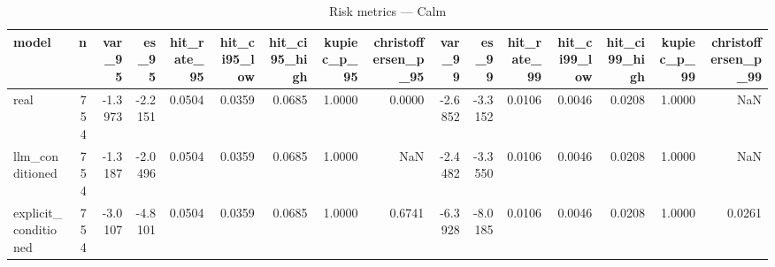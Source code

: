 \begin{table}
\caption{Risk metrics — Calm}
\label{tab:risk_Calm}
\begin{tabular}{lrrrrrrrrrrrrrrr}
\toprule
model & n & var\_95 & es\_95 & hit\_rate\_95 & hit\_ci95\_low & hit\_ci95\_high & kupiec\_p\_95 & christoffersen\_p\_95 & var\_99 & es\_99 & hit\_rate\_99 & hit\_ci99\_low & hit\_ci99\_high & kupiec\_p\_99 & christoffersen\_p\_99 \\
\midrule
real & 754 & -1.3973 & -2.2151 & 0.0504 & 0.0359 & 0.0685 & 1.0000 & 0.0000 & -2.6852 & -3.3152 & 0.0106 & 0.0046 & 0.0208 & 1.0000 & NaN \\
llm\_conditioned & 754 & -1.3187 & -2.0496 & 0.0504 & 0.0359 & 0.0685 & 1.0000 & NaN & -2.4482 & -3.3550 & 0.0106 & 0.0046 & 0.0208 & 1.0000 & NaN \\
explicit\_conditioned & 754 & -3.0107 & -4.8101 & 0.0504 & 0.0359 & 0.0685 & 1.0000 & 0.6741 & -6.3928 & -8.0185 & 0.0106 & 0.0046 & 0.0208 & 1.0000 & 0.0261 \\
\bottomrule
\end{tabular}
\end{table}
